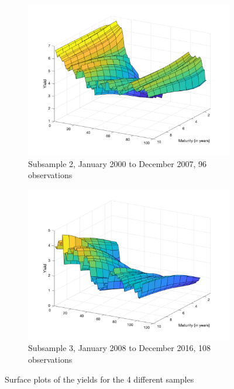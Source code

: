 \begin{figure}
     \begin{subfigure}[b]{0.45\textwidth}
         \centering
         \includegraphics[width=\textwidth]{figures/sample2}
         \caption{Subsample 2, January 2000 to December 2007, 96 observations}
         \label{fig:subsample2}
     \end{subfigure}
     \begin{subfigure}[b]{0.45\textwidth}
         \centering
         \includegraphics[width=\textwidth]{figures/sample3}
         \caption{Subsample 3, January 2008 to December 2016, 108 observations}
         \label{fig:subsample3}
     \end{subfigure}
     \caption{Surface plots of the yields for the 4 different samples}
     \label{fig:samples}
\end{figure}